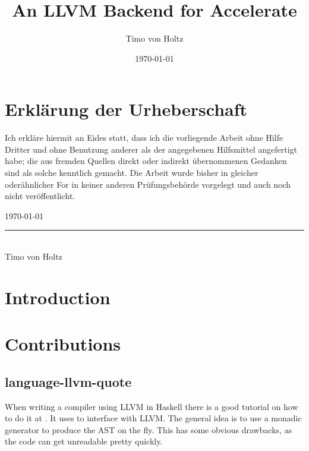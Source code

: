 \documentclass[a4paper,bibliography=totocnumbered,parskip=half]{scrbook}
\begin{document}
\frontmatter

\titlehead{
  {\large Programming Languages and Compiler Construction}\\
  Department of Computer Science\\
  Christian-Albrechts-University of Kiel}
\subject{Master Thesis}
\date{\today}
\title{An LLVM Backend for Accelerate}
\author{Timo von Holtz}
\publishers{Advised By:\\Priv.-Doz. Dr. Frank Huch\\Assoc. Prof. Dr. Manuel M T Chakravarty}
\maketitle

\chapter*{Erklärung der Urheberschaft}

Ich erkläre hiermit an Eides statt, dass ich die vorliegende Arbeit ohne Hilfe Dritter und ohne Benutzung anderer als der angegebenen Hilfsmittel angefertigt habe;
die aus fremden Quellen direkt oder indirekt übernommenen Gedanken sind als solche kenntlich gemacht. 
Die Arbeit wurde bisher in gleicher oderähnlicher For in keiner anderen Prüfungsbehörde vorgelegt und auch noch nicht veröffentlicht.


\today
\begin{flushright}
\rule{6cm}{0.4pt} \\
Timo von Holtz
\end{flushright}
\clearpage

\listoftodos
\tableofcontents   %
\listoffigures     %
\listoftables      %
\lstlistoflistings %
\mainmatter

\chapter{Introduction}
\Blindtext

\chapter{Contributions}
\section{language-llvm-quote}
When writing a compiler using LLVM in Haskell there is a good tutorial on how to do it at .
It uses  to interface with LLVM.
The general idea is to use a monadic generator to produce the AST on the fly.
This has some obvious drawbacks, as the code can get unreadable pretty quickly. 
\end{document}
